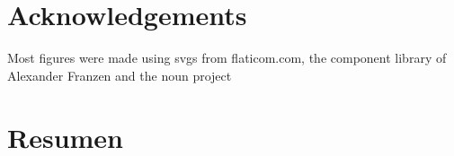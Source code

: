 \documentclass[12pt]{book}
\newcommand\blankpage{
    \null
    \thispagestyle{empty}
    \addtocounter{page}{0}
    \newpage
    }
\begin{document}

\chapter*{Acknowledgements}
\thispagestyle{plain}
Most figures were made using svgs from flaticom.com, the component library of Alexander Franzen and the noun project

\pagebreak



\blankpage{}
\chapter*{Resumen}
\end{document}
